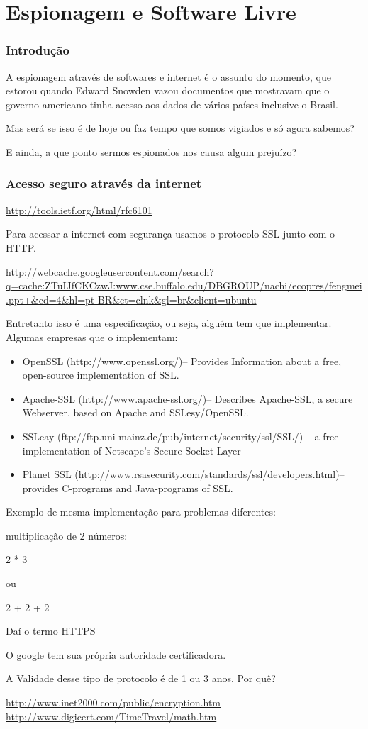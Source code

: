 \section{Espionagem e Software Livre}

\begin{frame}\frametitle{Introdução}

A espionagem através de softwares e internet é o assunto do momento, que
estorou quando Edward Snowden vazou documentos que mostravam que o
governo americano tinha acesso aos dados de vários países inclusive o
Brasil.

Mas será se isso é de hoje ou faz tempo que somos vigiados e só agora
sabemos?

E ainda, a que ponto sermos espionados nos causa algum prejuízo?

\end{frame}

\begin{frame}[fragile]\frametitle{Acesso seguro através da internet}

\url{http://tools.ietf.org/html/rfc6101}

Para acessar a internet com segurança usamos o protocolo SSL junto com o
HTTP.

\url{http://webcache.googleusercontent.com/search?q=cache:ZTuIJfCKCzwJ:www.cse.buffalo.edu/DBGROUP/nachi/ecopres/fengmei.ppt+&cd=4&hl=pt-BR&ct=clnk&gl=br&client=ubuntu}

Entretanto isso é uma especificação, ou seja, alguém tem que
implementar. Algumas empresas que o implementam:

\begin{itemize}
\item
  OpenSSL (http://www.openssl.org/)-- Provides Information about a free,
  open-source implementation of SSL.
\item
  Apache-SSL (http://www.apache-ssl.org/)-- Describes Apache-SSL, a
  secure Webserver, based on Apache and SSLesy/OpenSSL.
\item
  SSLeay (ftp://ftp.uni-mainz.de/pub/internet/security/ssl/SSL/) -- a
  free implementation of Netscape's Secure Socket Layer
\item
  Planet SSL
  (http://www.rsasecurity.com/standards/ssl/developers.html)-- provides
  C-programs and Java-programs of SSL.
\end{itemize}
Exemplo de mesma implementação para problemas diferentes:

multiplicação de 2 números:

2 * 3

ou

2 + 2 + 2

Daí o termo HTTPS

O google tem sua própria autoridade certificadora.

A Validade desse tipo de protocolo é de 1 ou 3 anos. Por quê?

\url{http://www.inet2000.com/public/encryption.htm}
\url{http://www.digicert.com/TimeTravel/math.htm}

\end{frame}

